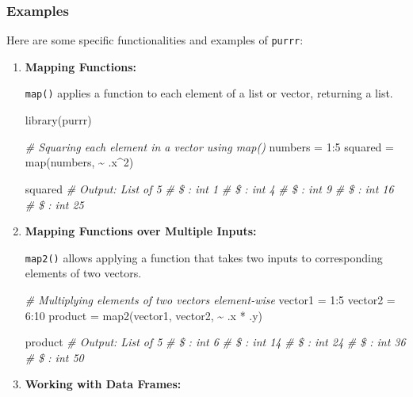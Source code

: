 \documentclass[
]{article}
\newenvironment{Shaded}{}{}
\newcommand{\CommentTok}[1]{\textcolor[rgb]{0.38,0.63,0.69}{\textit{#1}}}
\newcommand{\DecValTok}[1]{\textcolor[rgb]{0.25,0.63,0.44}{#1}}
\newcommand{\FunctionTok}[1]{\textcolor[rgb]{0.02,0.16,0.49}{#1}}
\newcommand{\NormalTok}[1]{#1}
\newcommand{\OtherTok}[1]{\textcolor[rgb]{0.00,0.44,0.13}{#1}}
\newcommand{\SpecialCharTok}[1]{\textcolor[rgb]{0.25,0.44,0.63}{#1}}
\begin{document}
\hypertarget{examples}{%
\subsubsection{Examples}\label{examples}}

Here are some specific functionalities and examples of \texttt{purrr}:

\begin{enumerate}
\def\labelenumi{\arabic{enumi}.}
\item
  \textbf{Mapping Functions:}

  \texttt{map()} applies a function to each element of a list or vector,
  returning a list.

\begin{Shaded}
\begin{Highlighting}[]
 \FunctionTok{library}\NormalTok{(purrr)}

 \CommentTok{\# Squaring each element in a vector using map()}
\NormalTok{ numbers }\OtherTok{=} \DecValTok{1}\SpecialCharTok{:}\DecValTok{5}
\NormalTok{ squared }\OtherTok{=} \FunctionTok{map}\NormalTok{(numbers, }\SpecialCharTok{\textasciitilde{}}\NormalTok{ .x}\SpecialCharTok{\^{}}\DecValTok{2}\NormalTok{)}

\NormalTok{ squared}
 \CommentTok{\# Output: List of 5}
 \CommentTok{\# \$ : int 1}
 \CommentTok{\# \$ : int 4}
 \CommentTok{\# \$ : int 9}
 \CommentTok{\# \$ : int 16}
 \CommentTok{\# \$ : int 25}
\end{Highlighting}
\end{Shaded}
\item
  \textbf{Mapping Functions over Multiple Inputs:}

  \texttt{map2()} allows applying a function that takes two inputs to
  corresponding elements of two vectors.

\begin{Shaded}
\begin{Highlighting}[]
 \CommentTok{\# Multiplying elements of two vectors element{-}wise}
\NormalTok{ vector1 }\OtherTok{=} \DecValTok{1}\SpecialCharTok{:}\DecValTok{5}
\NormalTok{ vector2 }\OtherTok{=} \DecValTok{6}\SpecialCharTok{:}\DecValTok{10}
\NormalTok{ product }\OtherTok{=} \FunctionTok{map2}\NormalTok{(vector1, vector2, }\SpecialCharTok{\textasciitilde{}}\NormalTok{ .x }\SpecialCharTok{*}\NormalTok{ .y)}

\NormalTok{ product}
 \CommentTok{\# Output: List of 5}
 \CommentTok{\# \$ : int 6}
 \CommentTok{\# \$ : int 14}
 \CommentTok{\# \$ : int 24}
 \CommentTok{\# \$ : int 36}
 \CommentTok{\# \$ : int 50}
\end{Highlighting}
\end{Shaded}
\item
  \textbf{Working with Data Frames:}


\end{enumerate}
\end{document}
